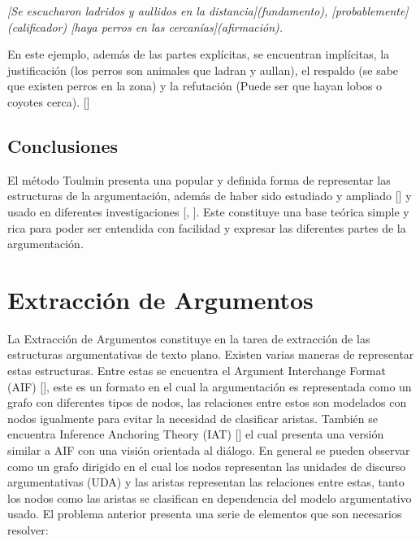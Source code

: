 \emph{[Se escucharon ladridos y aullidos en la distancia](fundamento), [probablemente](calificador) 
[haya perros en las cercanías](afirmación).}

En este ejemplo, además de las partes explícitas, se encuentran implícitas, la justificación 
(los perros son animales que ladran y aullan), el respaldo (se sabe que existen perros en la zona) y 
la refutación (Puede ser que hayan lobos o coyotes cerca). [\cite{toulminArgument}]

\subsection{Conclusiones}

El método Toulmin presenta una popular y definida forma de representar las estructuras de la argumentación, 
además de haber sido estudiado y ampliado [\cite{freeman2011argument}] y usado en diferentes 
investigaciones [\cite{stab2017parsing}, \cite{niculae2017argument}]. Este constituye una base
teórica simple y rica para poder ser entendida con facilidad y expresar las diferentes partes de la 
argumentación. 

\section{Extracción de Argumentos}


La Extracción de Argumentos constituye en la tarea de extracción de las estructuras argumentativas
de texto plano. Existen varias maneras de representar estas estructuras. Entre estas se encuentra
el Argument Interchange Format (AIF) [\cite{rahwan2009aif}], este es un formato en el cual la argumentación
es representada como un grafo con diferentes tipos de nodos, las relaciones entre estos son modelados con 
nodos igualmente para evitar la necesidad de clasificar aristas. También se encuentra Inference Anchoring Theory 
(IAT) [\cite{corneli2019iat}] el cual presenta una versión similar a AIF con una visión orientada al diálogo.
En general se pueden observar como un grafo dirigido en el cual los nodos representan las unidades de
discurso argumentativas (UDA) y las aristas representan las relaciones entre estas, tanto los nodos como
las aristas se clasifican en dependencia del modelo argumentativo usado.
El problema anterior presenta una serie de elementos que son necesarios resolver:

